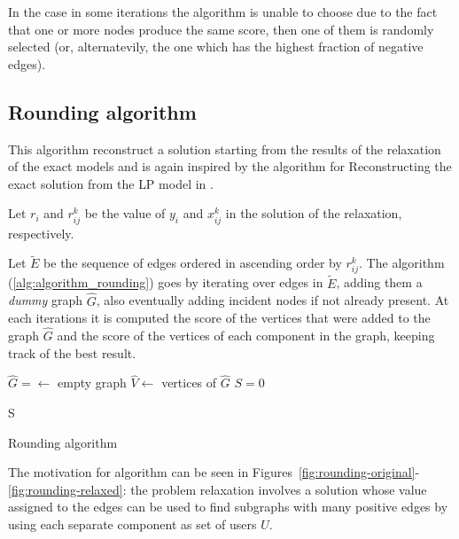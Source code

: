 In the case in some iterations the algorithm is unable to choose due to the
fact that one or more nodes produce the same score, then one of them is
randomly selected (or, alternatevily, the one which has the highest fraction of
negative edges).

\subsection{Rounding algorithm}%
\label{ssub:rounding_algorithm}

This algorithm reconstruct a solution starting from the results of the
relaxation of the exact models and is again inspired by the algorithm for
Reconstructing the exact solution from the \acrshort{LP} model in
\cite{charikar2000greedy}.

Let $r_{i}$ and $r_{ij} ^{k} $ be the value of $y_i$ and $x_{ij}^{k} $ in the
solution of the relaxation, respectively.

Let $\tilde{E}$ be the sequence of edges ordered in ascending order by $r_{ij}
		^{k} $. The algorithm (\autoref{alg:algorithm_rounding}) goes by iterating over
edges in $\tilde{E}$, adding them a \emph{dummy} graph $\hat{G}$, also eventually
adding incident nodes if not already present. At each iterations it is computed
the score of the vertices that were added to the graph $\hat{G}$ and the score
of the vertices of each component in the graph, keeping track of the best
result.

\begin{algorithm}
	\SetAlgoLined
	$\hat{G} = \leftarrow $ empty graph \;
	$\hat{V} \leftarrow $ vertices of $\hat{G}$ \;
	$S = 0$


	\Return S \;
	\caption{Rounding algorithm}
	\label{alg:algorithm_rounding}
\end{algorithm}

The motivation for algorithm can be seen in
Figures~\ref{fig:rounding-original}-\ref{fig:rounding-relaxed}: the problem
relaxation involves a solution whose value assigned to the edges can be used to
find subgraphs with many positive edges by using each separate component as set
of users $U$.

